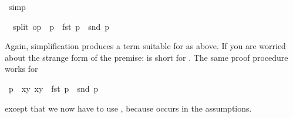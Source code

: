 \begin{isabellebody}
\isamarkupfalse%
\ simp\isamarkupfalse%
%
\begin{isamarkuptxt}%
\begin{isabelle}%
\ {}{\isachardot}\ split\ op\ {\isacharequal}\ p\ {\isasymlongrightarrow}\ fst\ p\ {\isacharequal}\ snd\ p%
\end{isabelle}
Again, simplification produces a term suitable for 
as above. If you are worried about the strange form of the premise:
 is short for .
The same proof procedure works for%
\end{isamarkuptxt}%
\isamarkuptrue%
\isamarkupfalse%
\ {\isachardoublequote}p\ {\isasymin}\ {\isacharbraceleft}{\isacharparenleft}x{\isacharcomma}y{\isacharparenright}{\isachardot}\ x{\isacharequal}y{\isacharbraceright}\ {\isasymLongrightarrow}\ fst\ p\ {\isacharequal}\ snd\ p{\isachardoublequote}\isamarkupfalse%
%
\begin{isamarkuptxt}%
\noindent
except that we now have to use , because
 occurs in the assumptions.


\end{isamarkuptxt}
\end{isabellebody}
